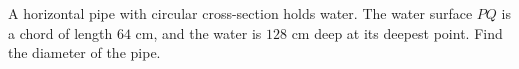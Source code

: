 A horizontal pipe with circular cross-section holds water. The water surface $PQ$ is a chord of length $64$ cm, and the water is $128$ cm deep at its deepest point. Find the diameter of the pipe.
